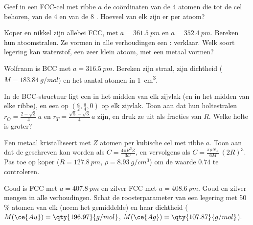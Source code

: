 \begin{exercise}[$\star\star$]\label{exo:b1:crystals-metals:7}
Geef in een FCC-cel met ribbe $a$ de coördinaten van de 4 atomen die tot
de cel behoren, van de 4  en van de 8 . Hoeveel van elk zijn er per atoom?
\end{exercise}

\begin{exercise}[$\star\star$]\label{exo:b1:crystals-metals:8}
Koper en nikkel zijn allebei FCC, met $a = \qty{361.5}{pm}$ en
$a = \qty{352.4}{pm}$. Bereken hun atoomstralen. Ze vormen in alle
verhoudingen een : verklaar. Welk soort legering kan
waterstof, een zeer klein atoom, met een metaal vormen?
\end{exercise}


\begin{exercise}[$\star\star$]\label{exo:b1:crystals-metals:9}
Wolfraam is BCC met $a = \qty{316.5}{pm}$. Bereken zijn straal, zijn
dichtheid ($M = \qty{183.84}{g/mol}$) en het aantal atomen in
\qty{1}{cm^3}.
\end{exercise}


\begin{exercise}[$\star\star\star$]\label{exo:b1:crystals-metals:10}
In de BCC-structuur ligt een  in het midden van elk
zijvlak (en in het midden van elke ribbe), en een  op
$(\frac{a}{2}, \frac{a}{4}, 0)$ op elk zijvlak. Toon aan dat hun
holtestralen $r_O = \frac{2 - \sqrt3}{4}\,a$ en
$r_T = \frac{\sqrt5 - \sqrt3}{4}\,a$ zijn, en druk ze uit als fracties
van $R$. Welke holte is groter?
\end{exercise}

\begin{exercise}[$\star\star\star$]\label{exo:b1:crystals-metals:11}
Een metaal kristalliseert met $Z$ atomen per kubische cel met ribbe $a$.
Toon aan dat de  geschreven kan worden als
$C = \frac{4\pi R^3 Z}{3a^3}$, en vervolgens als
$C = \frac{\pi\rho N_A}{6M}\,(2R)^3$. Pas toe op koper
($R = \qty{127.8}{pm}$, $\rho = \qty{8.93}{g/cm^3}$) om de waarde $0.74$
te controleren.
\end{exercise}

\begin{exercise}[$\star\star\star$]\label{exo:b1:crystals-metals:12}
Goud is FCC met $a = \qty{407.8}{pm}$ en zilver FCC met
$a = \qty{408.6}{pm}$. Goud en zilver mengen in alle verhoudingen. Schat
de roosterparameter van een legering met 50\,\% atomen van elk (neem het
gemiddelde) en haar dichtheid ($M(\ce{Au}) = \qty{196.97}{g/mol}$,
$M(\ce{Ag}) = \qty{107.87}{g/mol}$).
\end{exercise}


